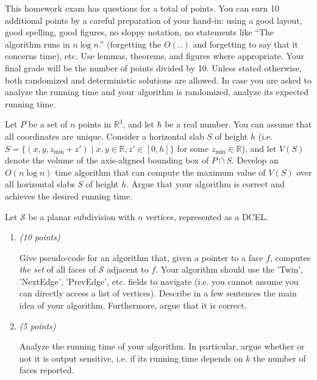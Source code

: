\documentclass{article}
\title{\mytitle}
\date{\textbf{Deadline: } \deadline}
\author{{\color{red} My name and StudentID go here!}}
\newcommand{\withpoints}[1]{%
  \addtocounter{pointscounter}{#1} \printpoints{#1}
}
\newcommand{\printpoints}[1]{%
   \ifthenelse{#1 = 0}
              {}
              {\textit{(#1 points)}}\mbox{}
}
\newenvironment{question}[1][0]{\begin{tcolorbox}[parbox=false
                                      ,breakable=true
                                      ,enhanced jigsaw
                                      ,title=\bfseries Question
                                      \stepcounter{questionscounter}\arabic{questionscounter}
                                      \withpoints{#1}]
                         }
                         {\end{tcolorbox}}
\newenvironment{subquestions}{\begin{enumerate}[leftmargin=*
                                        ]}
                             {\end{enumerate}}
\newcommand{\subquestion}[1][0]{\item \withpoints{#1}}
\newcommand{\numquestions}{\total{questionscounter}}
\newcommand{\numpoints}{\total{pointscounter}}
\newcommand{\mkmbb}[1]{\ensuremath{\mathbb{#1}}\xspace}
\newcommand{\R}{\mkmbb{R}}
\begin{document}
\maketitle
\thispagestyle{fancy}
\noindent
  This homework exam has \numquestions\xspace questions for a total of
  \numpoints\xspace points. You can earn 10 additional points by a
  careful preparation of your hand-in: using a good layout, good
  spelling, good figures, no sloppy notation, no statements like ``The
  algorithm runs in $n\log n$.''  (forgetting the $O(..)$ and
  forgetting to say that it concerns time), etc. Use lemmas, theorems,
  and figures where appropriate. Your final grade will be the number
  of points divided by 10. Unless stated otherwise, both randomized
  and deterministic solutions are allowed. In case you are asked to
  analyze the running time and your algorithm is randomized, analyze
  its expected running time.

  \begin{question}[10] Let $P$ be a set of $n$ points in $\R^3$, and let
    $h$ be a real number. You can assume that all coordinates are
    unique. Consider a horizontal slab $S$ of height $h$
    (i.e. $S=\{(x,y,z_{\min}+z') \mid x,y \in \R, z' \in [0,h]\}$ for
    some $z_{\min} \in \R$), and let $V(S)$ denote the volume of the
    axis-aligned bounding box of $P \cap S$. Develop an $O(n\log n)$
    time algorithm that can compute the maximum value of $V(S)$ over
    all horizontal slabs $S$ of height $h$. Argue that your algorithm
    is correct and achieves the desired running time.
  \end{question}

  \begin{question}
    Let $\mathcal{S}$ be a planar subdivision with $n$
    vertices, represented as a DCEL.

    \begin{subquestions}
      \subquestion[10] Give pseudo-code for an algorithm that, given a
      pointer to a face $f$, computes \emph{the set} of all faces of
      $\mathcal{S}$ adjacent to $f$. Your algorithm should use the
      'Twin', 'NextEdge', 'PrevEdge', etc. fields to navigate
      (i.e. you cannot assume you can directly access a list of
      vertices). Describe in a few sentences the main idea of your
      algorithm. Furthermore, argue that it is correct.

      \subquestion[5] Analyze the running time of your algorithm. In
      particular, argue whether or not it is output sensitive, i.e. if
      its running time depends on $k$ the number of faces reported.
    \end{subquestions}
  \end{question}
\end{document}

